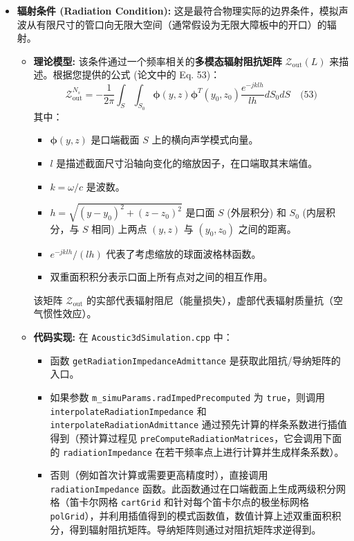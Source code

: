 \documentclass{ctexart}
\begin{document}
\begin{itemize}
    \begin{itemize}
        \item \textbf{辐射条件 (Radiation Condition):} 这是最符合物理实际的边界条件，模拟声波从有限尺寸的管口向无限大空间（通常假设为无限大障板中的开口）的辐射。
            \begin{itemize}
                \item \textbf{理论模型:} 该条件通过一个频率相关的\textbf{多模态辐射阻抗矩阵} $\boldsymbol{\mathcal{Z}}_{\text{out}}(L)$ 来描述。根据您提供的公式 (论文中的 Eq. 53)：
                \[
                \boldsymbol{\mathcal{Z}}_{\text{out}}^{N_s} = -\frac{1}{2\pi} \int_S \int_{S_0} \boldsymbol{\phi}(y,z) \boldsymbol{\phi}^T(y_0,z_0) \frac{e^{-jklh}}{lh} dS_0 dS \quad \text{(53)}
                \]
                其中：
                \begin{itemize}
                    \item $\boldsymbol{\phi}(y,z)$ 是口端截面 $S$ 上的横向声学模式向量。
                    \item $l$ 是描述截面尺寸沿轴向变化的缩放因子，在口端取其末端值。
                    \item $k = \omega/c$ 是波数。
                    \item $h = \sqrt{(y-y_0)^2+(z-z_0)^2}$ 是口面 $S$ (外层积分) 和 $S_0$ (内层积分，与 $S$ 相同) 上两点 $(y,z)$ 与 $(y_0,z_0)$ 之间的距离。
                    \item $e^{-jklh}/(lh)$ 代表了考虑缩放的球面波格林函数。
                    \item 双重面积积分表示口面上所有点对之间的相互作用。
                \end{itemize}
                该矩阵 $\boldsymbol{\mathcal{Z}}_{\text{out}}$ 的实部代表辐射阻尼（能量损失），虚部代表辐射质量抗（空气惯性效应）。
                \item \textbf{代码实现:} 在 \texttt{Acoustic3dSimulation.cpp} 中：
                    \begin{itemize}
                        \item 函数 \texttt{getRadiationImpedanceAdmittance} 是获取此阻抗/导纳矩阵的入口。
                        \item 如果参数 \texttt{m\_simuParams.radImpedPrecomputed} 为 \texttt{true}，则调用 \texttt{interpolateRadiationImpedance} 和 \texttt{interpolateRadiationAdmittance} 通过预先计算的样条系数进行插值得到（预计算过程见 \texttt{preComputeRadiationMatrices}，它会调用下面的 \texttt{radiationImpedance} 在若干频率点上进行计算并生成样条系数）。
                        \item 否则（例如首次计算或需要更高精度时），直接调用 \texttt{radiationImpedance} 函数。此函数通过在口端截面上生成两级积分网格（笛卡尔网格 \texttt{cartGrid} 和针对每个笛卡尔点的极坐标网格 \texttt{polGrid}），并利用插值得到的模式函数值，数值计算上述双重面积积分，得到辐射阻抗矩阵。导纳矩阵则通过对阻抗矩阵求逆得到。
                    \end{itemize}
            \end{itemize}


\end{itemize}
\end{itemize}
\end{document}
